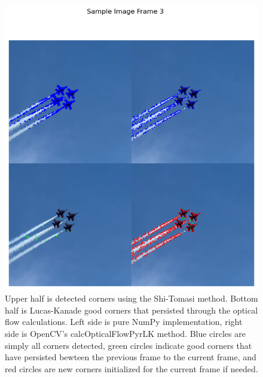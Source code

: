 \documentclass[11pt, conference, letterpaper]{IEEEtran}
\begin{document}
\begin{figure}[h]
    \centering
    \includegraphics[width=0.8\linewidth]{images/sample_image_3.png}
    \caption{Upper half is detected corners using the Shi-Tomasi method. Bottom half is Lucas-Kanade good corners that persisted through the optical flow calculations. Left side is pure NumPy implementation, right side is OpenCV's calcOpticalFlowPyrLK method. Blue circles are simply all corners detected, green circles indicate good corners that have persisted bewteen the previous frame to the current frame, and red circles are new corners initialized for the current frame if needed.}
    \label{fig:sample_4}
\end{figure}
\twocolumn
\end{document}
